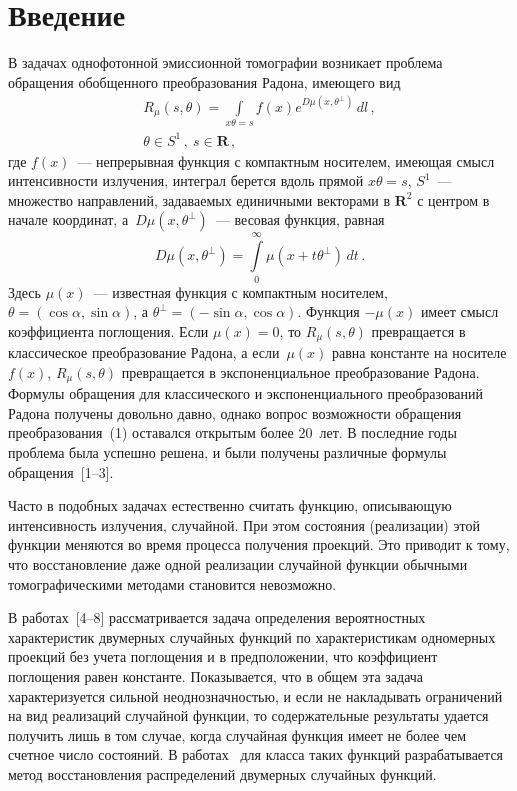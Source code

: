       \begin{multicols}{2}

      \label{st\stat}

\section{Введение}

В задачах однофотонной эмиссионной томографии возникает проблема
обращения обобщенного преобразования Радона, имеющего вид
\begin{multline}
R_\mu(s,\theta)=\int\limits_{x\theta=s}f(x)e^{D\mu(x,\theta^{\perp})}\,dl\,,\\
\theta\in S^1\,,\ s\in\mathbf{R}\,,
\label{e1u}
\end{multline} 
где $f(x)$~--- непрерывная функция
с компактным носителем, имеющая смысл интенсивности излучения,
интеграл берется вдоль прямой $x\theta=s$, $S^1$~---
множество направлений, задаваемых единичными векторами в
$\mathbf{R}^2$ с центром в начале координат, а~$D\mu(x,\theta^{\perp})$~--- весовая функция, равная
$$
D\mu(x,\theta^{\perp})=\int\limits_{0}^{\infty}\mu(x+t\theta^{\perp})\,dt\,.
$$
Здесь $\mu(x)$~--- известная функция с компактным носителем,
$\theta=(\cos\alpha,\sin\alpha)$, а
$\theta^{\perp}=(-\sin\alpha,\cos\alpha)$. Функция $-\mu(x)$ имеет
смысл коэффициента поглощения. Если $\mu(x)=0$, то
$R_\mu(s,\theta)$ превращается в классическое преобразование
Радона, а если~$\mu(x)$ равна константе на носителе $f(x)$,
$R_\mu(s,\theta)$ превращается в экспоненциальное преобразование
Радона. Формулы обращения для классического и экспоненциального
преобразований Радона получены довольно давно, однако вопрос
возможности обращения преобразования~(1) оставался открытым более
20~лет. В последние годы проблема была успешно решена, и были
получены различные формулы обращения~[1--3].

Часто в подобных задачах естественно считать функцию, описывающую интенсивность излучения, случайной.
При этом состояния (реализации) этой функции меняются во время
процесса получения проекций. Это приводит к тому, что
восстановление даже одной реализации случайной функции обычными
томографическими методами становится невозможно.

В работах~[4--8] рассматривается задача определения вероятностных характеристик двумерных случайных функций
по характеристикам одномерных проекций без учета поглощения и в
предположении, что коэффициент поглощения равен константе.
Показывается, что в общем эта задача характеризуется сильной
неоднозначностью, и если не накладывать ограничений на вид
реализаций случайной функции, то содержательные результаты удается
получить лишь в том случае, когда случайная функция имеет не более
чем счетное число состояний. В работах~\cite{6u, 8u} для класса таких
функций разрабатывается метод восстановления распределений
двумерных случайных функций.


\end{multicols}

